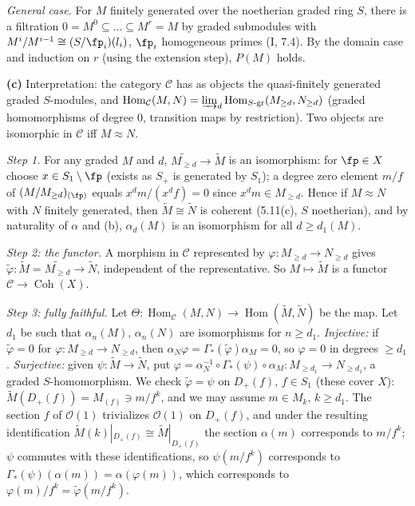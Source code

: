 \documentclass[11pt]{article}
\begin{document}
\emph{General case.} For $M$ finitely generated over the noetherian graded ring $S$, there is a filtration $0=M^0\subseteq\dots\subseteq M^r=M$ by graded submodules with $M^i/M^{i-1}\cong(S/\fp_i)(l_i)$, $\fp_i$ homogeneous primes (I, 7.4). By the domain case and induction on $r$ (using the extension step), $P(M)$ holds.

\textbf{(c)} Interpretation: the category $\mathcal C$ has as objects the quasi-finitely generated graded $S$-modules, and $\operatorname{Hom}_{\mathcal C}(M,N)=\varinjlim_d\operatorname{Hom}_{S\text{-gr}}(M_{\ge d},N_{\ge d})$ (graded homomorphisms of degree $0$, transition maps by restriction). Two objects are isomorphic in $\mathcal C$ iff $M\approx N$.

\emph{Step 1.} For any graded $M$ and $d$, $\widetilde{M_{\ge d}}\to\widetilde M$ is an isomorphism: for $\fp\in X$ choose $x\in S_1\setminus\fp$ (exists as $S_+$ is generated by $S_1$); a degree zero element $m/f$ of $(M/M_{\ge d})_{(\fp)}$ equals $x^dm/(x^df)=0$ since $x^dm\in M_{\ge d}$. Hence if $M\approx N$ with $N$ finitely generated, then $\widetilde M\cong\widetilde N$ is coherent (5.11(c), $S$ noetherian), and by naturality of $\alpha$ and (b), $\alpha_d(M)$ is an isomorphism for all $d\ge d_1(M)$.

\emph{Step 2: the functor.} A morphism in $\mathcal C$ represented by $\varphi:M_{\ge d}\to N_{\ge d}$ gives $\widetilde\varphi:\widetilde M=\widetilde{M_{\ge d}}\to\widetilde N$, independent of the representative. So $M\mapsto\widetilde M$ is a functor $\mathcal C\to\operatorname{Coh}(X)$.

\emph{Step 3: fully faithful.} Let $\Theta:\operatorname{Hom}_{\mathcal C}(M,N)\to\operatorname{Hom}(\widetilde M,\widetilde N)$ be the map. Let $d_1$ be such that $\alpha_n(M)$, $\alpha_n(N)$ are isomorphisms for $n\ge d_1$. \emph{Injective:} if $\widetilde\varphi=0$ for $\varphi:M_{\ge d}\to N_{\ge d}$, then $\alpha_N\varphi=\Gamma_*(\widetilde\varphi)\alpha_M=0$, so $\varphi=0$ in degrees $\ge d_1$. \emph{Surjective:} given $\psi:\widetilde M\to\widetilde N$, put $\varphi=\alpha_N^{-1}\circ\Gamma_*(\psi)\circ\alpha_M:M_{\ge d_1}\to N_{\ge d_1}$, a graded $S$-homomorphism. We check $\widetilde\varphi=\psi$ on $D_+(f)$, $f\in S_1$ (these cover $X$): $\widetilde M(D_+(f))=M_{(f)}\ni m/f^k$, and we may assume $m\in M_k$, $k\ge d_1$. The section $f$ of $\mathcal O(1)$ trivializes $\mathcal O(1)$ on $D_+(f)$, and under the resulting identification $\widetilde M(k)|_{D_+(f)}\cong\widetilde M|_{D_+(f)}$ the section $\alpha(m)$ corresponds to $m/f^k$; $\psi$ commutes with these identifications, so $\psi(m/f^k)$ corresponds to $\Gamma_*(\psi)(\alpha(m))=\alpha(\varphi(m))$, which corresponds to $\varphi(m)/f^k=\widetilde\varphi(m/f^k)$.
\end{document}
